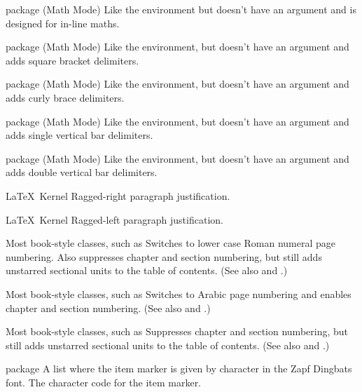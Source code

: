 %
 {}%
 { package (Math Mode)}%
 {%
   Like the  environment but doesn't have an
   argument and is designed for in-line maths.
 }%
 {}

%
 {}%
 { package (Math Mode)}%
 {%
   Like the  environment, but doesn't have an
   argument and adds square bracket delimiters.
 }%
 {}

%
 {}%
 { package (Math Mode)}%
 {%
   Like the  environment, but doesn't have an
   argument and adds curly brace delimiters.
 }%
 {}

%
 {}%
 { package (Math Mode)}%
 {%
   Like the  environment, but doesn't have an
   argument and adds single vertical bar delimiters.
 }%
 {}

%
 {}%
 { package (Math Mode)}%
 {%
   Like the  environment, but doesn't have an
   argument and adds double vertical bar delimiters.
 }%
 {}

%
 {}%
 {\LaTeX\ Kernel}%
 {Ragged-right paragraph justification.}%
 {}

%
 {}%
 {\LaTeX\ Kernel}%
 {Ragged-left paragraph justification.}%
 {}

 {}%
 {Most book-style classes, such as }%
 {Switches to lower case Roman numeral page numbering. Also suppresses
   chapter and section numbering, but still adds unstarred sectional
   units to the table of contents. (See also 
   and .)}%
 {}

 {}%
 {Most book-style classes, such as }%
 {Switches to Arabic page numbering and enables
   chapter and section numbering. (See also
    and .)}%
 {}

 {}%
 {Most book-style classes, such as }%
 {Suppresses chapter and section numbering, but still adds unstarred
  sectional units to the table of contents. (See also 
  and .)}%
 {}

 {}
 { package}
 {A list where the item marker is given by character 
  in the Zapf Dingbats font.}
 {%
   \BeginArgList
     The character code for the item marker.
   \EndArgList
 }

